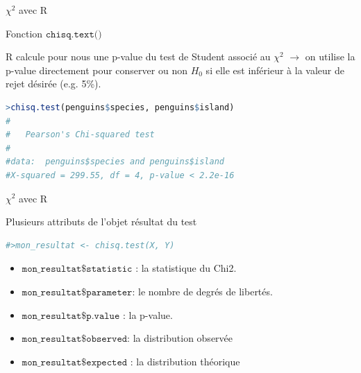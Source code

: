 \documentclass{beamer}
\begin{document}
\begin{frame}[fragile]{$\chi ^2$ avec R }

Fonction  $\texttt{chisq.text()}$

R calcule pour nous une  p-value du test de Student associé au $\chi^2$ $\rightarrow$ on utilise la p-value directement pour conserver ou non $H_0$ si elle est inférieur à la valeur de rejet désirée (e.g. 5\%).

\vspace{0.6cm}

\begin{scriptsize}
\begin{spacing}{0.75}
\begin{lstlisting}[language=R,basicstyle=\footnotesize\ttfamily, commentstyle=\ttfamily]
>chisq.test(penguins$species, penguins$island)
#
#	Pearson's Chi-squared test
#
#data:  penguins$species and penguins$island
#X-squared = 299.55, df = 4, p-value < 2.2e-16
\end{lstlisting}
\end{spacing}
\end{scriptsize}
\end{frame}


\begin{frame}[fragile]{$\chi ^2$ avec R }

Plusieurs attributs de l'objet résultat du test 

\vspace{0.6cm}

\begin{scriptsize}
\begin{spacing}{0.75}
\begin{lstlisting}[language=R,basicstyle=\footnotesize\ttfamily, commentstyle=\ttfamily]
#>mon_resultat <- chisq.test(X, Y)
\end{lstlisting}
\end{spacing}
\end{scriptsize}

\vspace{0.6cm}


\begin{itemize}
\item $\texttt{mon\_resultat\$statistic}$ : la statistique du Chi2.
\item $\texttt{mon\_resultat\$parameter}$: le nombre de degrés de libertés.
\item $\texttt{mon\_resultat\$p.value}$ : la p-value.
\item $\texttt{mon\_resultat\$observed}$: la distribution observée
\item $\texttt{mon\_resultat\$expected}$ : la distribution théorique 
\end{itemize}

\end{frame}
\end{document}
